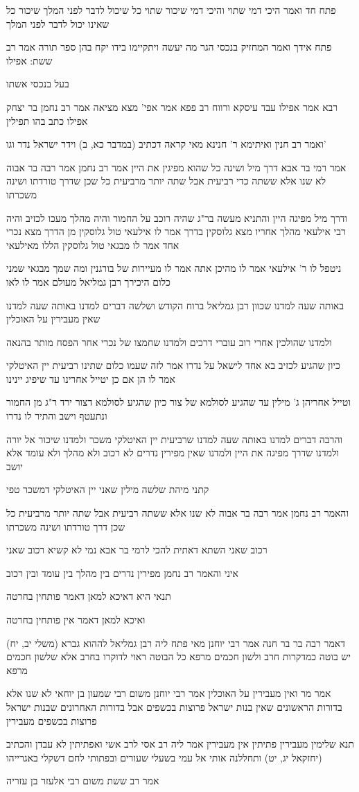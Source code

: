 \documentclass[12pt, openany]{book}
\newcommand{\sethebfont}{
\fontsize{10.5pt}{21.0pt} \selectfont
}
\newcommand{\textblock}[1]{
{\sethebfont #1\\}	
}
\begin{document}
\textblock{פתח חד ואמר היכי דמי שתוי והיכי דמי שיכור שתוי כל שיכול לדבר לפני המלך שיכור כל שאינו יכול לדבר לפני המלך}
\textblock{פתח אידך ואמר המחזיק בנכסי הגר מה יעשה ויתקיימו בידו יקח בהן ספר תורה אמר רב ששת: אפילו}
\textblock{בעל בנכסי אשתו}
\textblock{רבא אמר אפילו עבד עיסקא ורווח רב פפא אמר אפי' מצא מציאה אמר רב נחמן בר יצחק אפילו כתב בהו תפילין}
\textblock{ואמר רב חנין ואיתימא ר' חנינא מאי קראה דכתיב (במדבר כא, ב) וידר ישראל נדר וגו'}
\textblock{אמר רמי בר אבא דרך מיל ושינה כל שהוא מפיגין את היין אמר רב נחמן אמר רבה בר אבוה לא שנו אלא ששתה כדי רביעית אבל שתה יותר מרביעית כל שכן שדרך טורדתו ושינה משכרתו}
\textblock{ודרך מיל מפיגה היין והתניא מעשה בר"ג שהיה רוכב על החמור והיה מהלך מעכו לכזיב והיה רבי אילעאי מהלך אחריו מצא גלוסקין בדרך אמר לו אילעאי טול גלוסקין מן הדרך מצא נכרי אחד אמר לו מבגאי טול גלוסקין הללו מאילעאי}
\textblock{ניטפל לו ר' אילעאי אמר לו מהיכן אתה אמר לו מעיירות של בורגנין ומה שמך מבגאי שמני כלום היכירך רבן גמליאל מעולם אמר לו לאו}
\textblock{באותה שעה למדנו שכוון רבן גמליאל ברוח הקודש ושלשה דברים למדנו באותה שעה למדנו שאין מעבירין על האוכלין}
\textblock{ולמדנו שהולכין אחרי רוב עוברי דרכים ולמדנו שחמצו של נכרי אחר הפסח מותר בהנאה}
\textblock{כיון שהגיע לכזיב בא אחד לישאל על נדרו אמר לזה שעמו כלום שתינו רביעית יין האיטלקי אמר לו הן אם כן יטייל אחרינו עד שיפיג יינינו}
\textblock{וטייל אחריהן ג' מילין עד שהגיע לסולמא של צור כיון שהגיע לסולמא דצור ירד ר"ג מן החמור ונתעטף וישב והתיר לו נדרו}
\textblock{והרבה דברים למדנו באותה שעה למדנו שרביעית יין האיטלקי משכר ולמדנו שיכור אל יורה ולמדנו שדרך מפיגה את היין ולמדנו שאין מפירין נדרים לא רכוב ולא מהלך ולא עומד אלא יושב}
\textblock{קתני מיהת שלשה מילין שאני יין האיטלקי דמשכר טפי}
\textblock{והאמר רב נחמן אמר רבה בר אבוה לא שנו אלא ששתה רביעית אבל שתה יותר מרביעית כל שכן דרך טורדתו ושינה משכרתו}
\textblock{רכוב שאני השתא דאתית להכי לרמי בר אבא נמי לא קשיא רכוב שאני}
\textblock{איני והאמר רב נחמן מפירין נדרים בין מהלך בין עומד ובין רכוב}
\textblock{תנאי היא דאיכא למאן דאמר פותחין בחרטה}
\textblock{ואיכא למאן דאמר אין פותחין בחרטה}
\textblock{דאמר רבה בר בר חנה אמר רבי יוחנן מאי פתח ליה רבן גמליאל לההוא גברא (משלי יב, יח) יש בוטה כמדקרות חרב ולשון חכמים מרפא כל הבוטה ראוי לדוקרו בחרב אלא שלשון חכמים מרפא}
\textblock{אמר מר ואין מעבירין על האוכלין אמר רבי יוחנן משום רבי שמעון בן יוחאי לא שנו אלא בדורות הראשונים שאין בנות ישראל פרוצות בכשפים אבל בדורות האחרונים שבנות ישראל פרוצות בכשפים מעבירין}
\textblock{תנא שלימין מעבירין פתיתין אין מעבירין אמר ליה רב אסי לרב אשי ואפתיתין לא עבדן והכתיב (יחזקאל יג, יט) ותחללנה אותי אל עמי בשעלי שעורים ובפתותי לחם דשקלי באגרייהו}
\textblock{אמר רב ששת משום רבי אלעזר בן עזריה}
\end{document}
